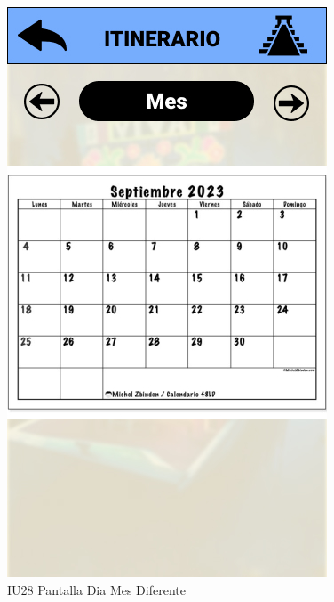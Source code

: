 \begin{figure}[h]
    \begin{minipage}{0.5\textwidth}
        \centering
        \includegraphics[width=.7\linewidth]{Pantallas Prototipo3/IU28 Pantalla Dia Mes Diferente.jpg}
        \caption{IU28 Pantalla Dia Mes Diferente}
    \end{minipage}%
\end{figure}

